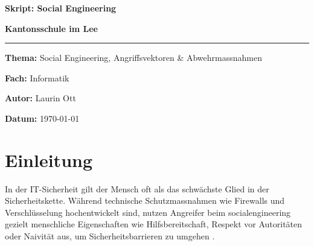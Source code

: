 \documentclass[12pt,a4paper]{article}
\begin{document}
\begin{titlepage}
    \centering
    \vspace*{2cm}
    
    {\Huge \textbf{Skript: Social Engineering} \par}
    \vspace{1.5cm}
    {\Large \textbf{Kantonsschule im Lee} \par}
    \vspace{2cm}
    
    \rule{\linewidth}{0.5mm}
    \vspace{2cm}
    
    {\large \textbf{Thema:} Social Engineering, Angriffsvektoren \& Abwehrmassnahmen \par}
    \vspace{0.5cm}
    {\large \textbf{Fach:} Informatik \par}
    \vspace{0.5cm}
    {\large \textbf{Autor:} Laurin Ott \par}
    
    \vfill
    
    {\large \textbf{Datum:} \today \par}
\end{titlepage}

\newpage
\tableofcontents
\newpage

\section{Einleitung}
In der IT-Sicherheit gilt der Mensch oft als das schwächste Glied in der Sicherheitskette. Während technische Schutzmassnahmen wie Firewalls und Verschlüsselung hochentwickelt sind, nutzen Angreifer beim \gls{socialengineering} gezielt menschliche Eigenschaften wie Hilfsbereitschaft, Respekt vor Autoritäten oder Naivität aus, um Sicherheitsbarrieren zu umgehen \cite{bsi2023socialengineering}.
\end{document}

